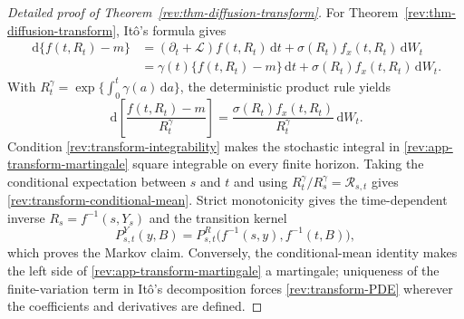 \documentclass[11pt]{article}
\theoremstyle{remark}
\newcommand{\dd}{\,\mathrm d}
\begin{document}
\begin{proof}[Detailed proof of Theorem~\ref{rev:thm-diffusion-transform}]
For Theorem~\ref{rev:thm-diffusion-transform}, It\^o's formula gives
\begin{align*}
\dd\{f(t,R_t)-m\}
&=(\partial_t+\mathcal L)f(t,R_t)\dd t
  +\sigma(R_t)f_x(t,R_t)\dd W_t\\
&=\gamma(t)\{f(t,R_t)-m\}\dd t
  +\sigma(R_t)f_x(t,R_t)\dd W_t.
\end{align*}
With $R_t^\gamma=\exp\{\int_0^t\gamma(a)\dd a\}$, the deterministic product
rule yields
\begin{equation}
\dd\!\left[\frac{f(t,R_t)-m}{R_t^\gamma}\right]
=\frac{\sigma(R_t)f_x(t,R_t)}{R_t^\gamma}\dd W_t.
\label{rev:app-transform-martingale}
\end{equation}
Condition \eqref{rev:transform-integrability} makes the stochastic integral in
\eqref{rev:app-transform-martingale} square integrable on every finite
horizon.  Taking the conditional expectation between $s$ and $t$ and using
$R_t^\gamma/R_s^\gamma=\mathcal R_{s,t}$ gives
\eqref{rev:transform-conditional-mean}.  Strict monotonicity gives the
time-dependent inverse $R_s=f^{-1}(s,Y_s)$ and the transition kernel
\[
P^Y_{s,t}(y,B)
=P^R_{s,t}\bigl(f^{-1}(s,y),f^{-1}(t,B)\bigr),
\]
which proves the Markov claim.  Conversely, the conditional-mean identity
makes the left side of \eqref{rev:app-transform-martingale} a martingale;
uniqueness of the finite-variation term in It\^o's decomposition forces
\eqref{rev:transform-PDE} wherever the coefficients and derivatives are
defined.
\end{proof}
\end{document}
